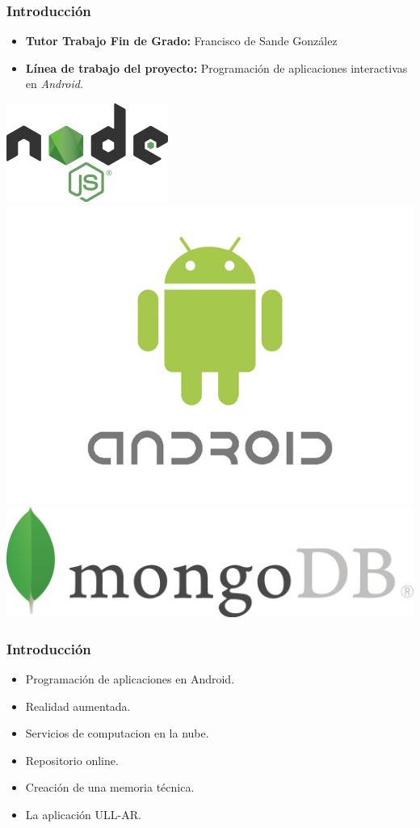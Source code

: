 \begin{frame}
    \frametitle{Introducción}
    \begin{itemize}
	\item \textbf{Tutor Trabajo Fin de Grado:} Francisco de Sande González
        \item \textbf{Línea de trabajo del proyecto:} Programación de aplicaciones interactivas en {\it Android}.
    \end{itemize}
        {\inserttitlegraphic\par}
		\vfill \includegraphics[width=0.2\linewidth]{Images/nodejs}
		\hfill %
		\includegraphics[width=0.2\linewidth]{Images/logos/android_logo}
		\hfill \includegraphics[width=0.35\linewidth]{Images/mongoDB}
\end{frame}
\begin{frame}
	\frametitle{Introducción}
		\begin{itemize}
			\item Programación de aplicaciones en Android.
			\item Realidad aumentada.
			\item Servicios de computacion en la nube. 
			\item Repositorio online.
			\item Creación de una memoria técnica.
			\item La aplicación ULL-AR. 
		\end{itemize}
	\endblock{}	
\end{frame}  
